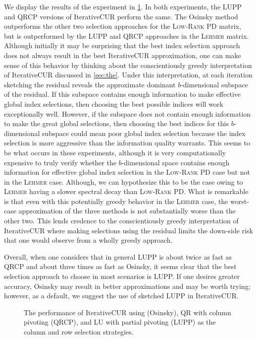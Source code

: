 We display the results of the experiment in \cref{fig:rand_svd_method_comp}. In both experiments, the LUPP and QRCP versions of IterativeCUR perform the same. The Osinsky method outperforms the other two selection approaches for the \textsc{Low-Rank PD} matrix, but is outperformed by the LUPP and QRCP approaches in the \textsc{Lehmer} matrix. Although initially it may be surprising that the best index selection approach does not always result in the best IterativeCUR approximation, one can make sense of this behavior by thinking about the conscientiously greedy interpretation of IterativeCUR discussed in \cref{sec:the}. Under this interpretation, at each iteration sketching the residual reveals the approximate dominant $b$-dimensional subspace of the residual. If this subspace contains enough information to make effective global index selections, then choosing the best possible indices will work exceptionally well. However, if the subspace does not contain enough information to make the great global selections, then choosing the best indices for this $b$-dimensional subspace could mean poor global index selection because the index selection is more aggressive than the information quality warrants. This seems to be what occurs in these experiments, although it is very computationally expensive to truly verify whether the $b$-dimensional space contains enough information for effective global index selection in the \textsc{Low-Rank PD} case but not in the \textsc{Lehmer} case. Although, we can hypothesize this to be the case owing to \textsc{Lehmer} having a slower spectral decay than \textsc{Low-Rank PD}. What is remarkable is that even with this potentially greedy behavior in the \textsc{Lehmer} case, the worst-case approximation of the three methods is not substantially worse than the other two. This lends credence to the conscientiously greedy interpretation of IterativeCUR where making selections using the residual limits the down-side risk that one would observe from a wholly greedy approach. 


Overall, when one considers that in general LUPP is about twice as fast as QRCP and about three times as fast as Osinsky, it seems clear that the best selection approach to choose in most scenarios is LUPP. If one desires greater accuracy, Osinsky may result in better approximations and may be worth trying; however, as a default, we suggest the use of sketched LUPP in IterativeCUR.



\begin{figure}[h]
    \centering
    
    
    \caption{The performance of IterativeCUR using \cite{osinsky2025close} (Osinsky), QR with column pivoting (QRCP), and LU with partial pivoting (LUPP) as the column and row selection strategies. }
    \label{fig:rand_svd_method_comp}
\end{figure}


